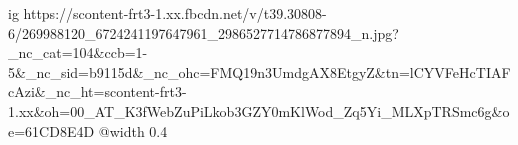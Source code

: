  
 
 
 
 

\ifcmt
  ig https://scontent-frt3-1.xx.fbcdn.net/v/t39.30808-6/269988120_6724241197647961_2986527714786877894_n.jpg?_nc_cat=104&ccb=1-5&_nc_sid=b9115d&_nc_ohc=FMQ19n3UmdgAX8EtgyZ&tn=lCYVFeHcTIAFcAzi&_nc_ht=scontent-frt3-1.xx&oh=00_AT_K3fWebZuPiLkob3GZY0mKlWod_Zq5Yi_MLXpTRSmc6g&oe=61CD8E4D
  @width 0.4
\fi
